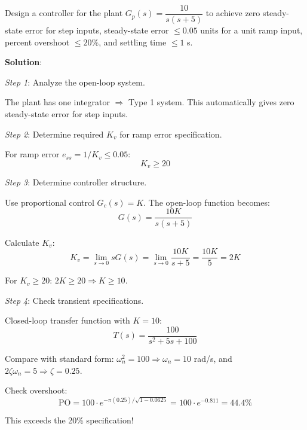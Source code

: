 \vspace{1em}

\begin{examplebox}
Design a controller for the plant $G_p(s) = \dfrac{10}{s(s+5)}$ to achieve zero steady-state error for step inputs, steady-state error $\leq 0.05$ units for a unit ramp input, percent overshoot $\leq 20\%$, and settling time $\leq 1$ s.

\textbf{Solution}:

\textit{Step 1}: Analyze the open-loop system.

The plant has one integrator $\Rightarrow$ Type 1 system. This automatically gives zero steady-state error for step inputs.

\textit{Step 2}: Determine required $K_v$ for ramp error specification.

For ramp error $e_{ss} = 1/K_v \leq 0.05$:
\begin{equation}
    K_v \geq 20
\end{equation}

\textit{Step 3}: Determine controller structure.

Use proportional control $G_c(s) = K$. The open-loop function becomes:
\begin{equation}
    G(s) = \frac{10K}{s(s+5)}
\end{equation}

Calculate $K_v$:
\begin{equation}
    K_v = \lim_{s\to 0} sG(s) = \lim_{s\to 0} \frac{10K}{s+5} = \frac{10K}{5} = 2K
\end{equation}

For $K_v \geq 20$: $2K \geq 20 \Rightarrow K \geq 10$.

\textit{Step 4}: Check transient specifications.

Closed-loop transfer function with $K = 10$:
\begin{equation}
    T(s) = \frac{100}{s^2 + 5s + 100}
\end{equation}

Compare with standard form: $\omega_n^2 = 100 \Rightarrow \omega_n = 10$ rad/s, and $2\zeta\omega_n = 5 \Rightarrow \zeta = 0.25$.

Check overshoot:
\begin{equation}
    \text{PO} = 100 \cdot e^{-\pi(0.25)/\sqrt{1-0.0625}} = 100 \cdot e^{-0.811} = 44.4\%
\end{equation}

This exceeds the 20\% specification!


\end{examplebox}
